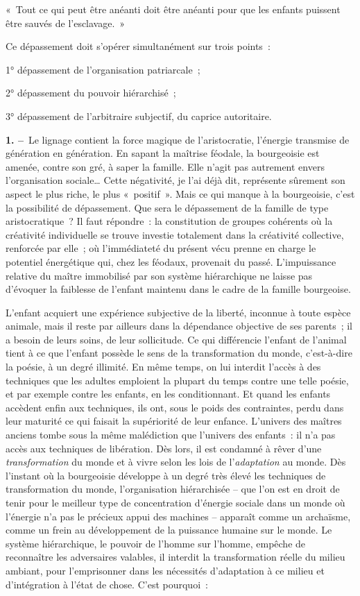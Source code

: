 \documentclass[french,twoside]{book} %
\newcommand{\labelchar}[1]{\textbf{\color{rubric} #1}}
\newenvironment{quoteblock}%
  {\begin{quoting}}
  {\end{quoting}}
\newenvironment{quotebar}{%
    \def\FrameCommand{{\color{rubric!10!}\vrule width 0.5em} \hspace{0.9em}}%
    \def\OuterFrameSep{\itemsep} %
    \MakeFramed {\advance\hsize-\width \FrameRestore}
  }%
  {%
    \endMakeFramed
  }
\renewenvironment{quoteblock}%
  {%
    \savenotes
    \setstretch{0.9}
    \normalfont
    \begin{quotebar}
  }
  {%
    \end{quotebar}
    \spewnotes
  }
\begin{document}
\begin{quoteblock}
\noindent « Tout ce qui peut être anéanti doit être anéanti pour que les enfants puissent être sauvés de l’esclavage. »\end{quoteblock}

\noindent Ce dépassement doit s’opérer simultanément sur trois points :\par
1° dépassement de l’organisation patriarcale ;\par
2° dépassement du pouvoir hiérarchisé ;\par
3° dépassement de l’arbitraire subjectif, du caprice autoritaire.\par
\labelchar{1. –} Le lignage contient la force magique de l’aristocratie, l’énergie transmise de génération en génération. En sapant la maîtrise féodale, la bourgeoisie est amenée, contre son gré, à saper la famille. Elle n’agit pas autrement envers l’organisation sociale… Cette négativité, je l’ai déjà dit, représente sûrement son aspect le plus riche, le plus « positif ». Mais ce qui manque à la bourgeoisie, c’est la possibilité de dépassement. Que sera le dépassement de la famille de type aristocratique ? Il faut répondre : la constitution de groupes cohérents où la créativité individuelle se trouve investie totalement dans la créativité collective, renforcée par elle ; où l’immédiateté du présent vécu prenne en charge le potentiel énergétique qui, chez les féodaux, provenait du passé. L’impuissance relative du maître immobilisé par son système hiérarchique ne laisse pas d’évoquer la faiblesse de l’enfant maintenu dans le cadre de la famille bourgeoise.\par
L’enfant acquiert une expérience subjective de la liberté, inconnue à toute espèce animale, mais il reste par ailleurs dans la dépendance objective de ses parents ; il a besoin de leurs soins, de leur sollicitude. Ce qui différencie l’enfant de l’animal tient à ce que l’enfant possède le sens de la transformation du monde, c’est-à-dire la poésie, à un degré illimité. En même temps, on lui interdit l’accès à des techniques que les adultes emploient la plupart du temps contre une telle poésie, et par exemple contre les enfants, en les conditionnant. Et quand les enfants accèdent enfin aux techniques, ils ont, sous le poids des contraintes, perdu dans leur maturité ce qui faisait la supériorité de leur enfance. L’univers des maîtres anciens tombe sous la même malédiction que l’univers des enfants : il n’a pas accès aux techniques de libération. Dès lors, il est condamné à rêver d’une \emph{transformation} du monde et à vivre selon les lois de l’\emph{adaptation} au monde. Dès l’instant où la bourgeoisie développe à un degré très élevé les techniques de transformation du monde, l’organisation hiérarchisée – que l’on est en droit de tenir pour le meilleur type de concentration d’énergie sociale dans un monde où l’énergie n’a pas le précieux appui des machines – apparaît comme un archaïsme, comme un frein au développement de la puissance humaine sur le monde. Le système hiérarchique, le pouvoir de l’homme sur l’homme, empêche de reconnaître les adversaires valables, il interdit la transformation réelle du milieu ambiant, pour l’emprisonner dans les nécessités d’adaptation à ce milieu et d’intégration à l’état de chose. C’est pourquoi :\par
\end{document}
